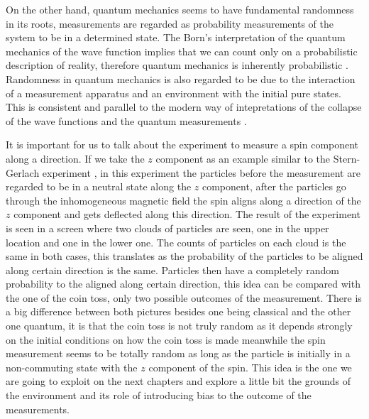On the other hand, quantum mechanics seems to have fundamental randomness in its roots, measurements are regarded as probability measurements of the system to be in a determined state.  The Born's interpretation of the quantum mechanics of the wave function implies that we can count only on a probabilistic description of reality, therefore quantum mechanics is inherently probabilistic \cite{born1955statistical}. Randomness in quantum mechanics is also regarded to be due to the interaction of a measurement apparatus and an environment with the initial pure states. This is consistent and parallel to the modern way of intepretations of the collapse of the wave functions and the quantum measurements \cite{wheeler2014quantum} 	\cite{zurek2003decoherence}\cite{zurek2009quantum}.\par 

It is important for us to talk about the experiment to measure a spin component along a direction. If we take the $z$ component  as an example similar to the Stern-Gerlach experiment \cite{gerlach1922experimentelle}, in this experiment the particles before the measurement are regarded to be in a neutral state along the $z$ component, after the particles go through the inhomogeneous magnetic field the spin aligns along a direction of the $z$ component and gets deflected along this direction. The result of the experiment is seen in a screen where two clouds of particles are seen, one in the upper location and one in the lower one. The counts of particles on each cloud is the same in both cases, this translates as the probability of the particles to be aligned along certain direction is the same. Particles then have a completely random probability to the aligned along certain direction, this idea can be compared with the one of the coin toss, only two possible outcomes of the measurement. There is a big difference between both pictures besides one being classical and the other one quantum, it is that the coin toss is not truly random as it depends strongly on the initial conditions on how the coin toss is made meanwhile the spin measurement seems to be totally random as long as the particle is initially in a non-commuting state with the $z$ component of the spin. This idea is the one we are going to exploit on the next chapters and explore a little bit the grounds of the environment and its role of introducing bias to the outcome of the measurements.



